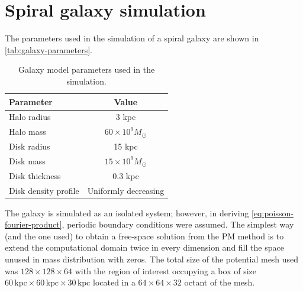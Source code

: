 \section{Spiral galaxy simulation}\label{sec:spiral-galaxy-sim}
The parameters used in the simulation of a spiral galaxy are shown in \autoref{tab:galaxy-parameters}.
\begin{table}[htp]
    \centering
    \begin{tabular}{|l|c|}
        \hline
        \textbf{Parameter}   & \textbf{Value}           \\
        \hline
        Halo radius          & 3 kpc                    \\
        Halo mass            & $60 \times 10^9 M_\odot$ \\
        Disk radius          & 15 kpc                   \\
        Disk mass            & $15 \times 10^9 M_\odot$ \\
        Disk thickness       & 0.3 kpc                  \\
        Disk density profile & Uniformly decreasing     \\
        \hline
    \end{tabular}
    \caption{Galaxy model parameters used in the simulation.}
    \label{tab:galaxy-parameters}
\end{table}
The galaxy is simulated as an isolated system; however, in deriving \autoref{eq:poisson-fourier-product}, periodic boundary conditions were assumed.
The simplest way (and the one used) to obtain a free-space solution from the PM method is to extend the computational domain twice in every dimension and fill the space unused in mass distribution with zeros.
The total size of the potential mesh used was $128 \times 128 \times 64$ with the region of interest occupying a box of size $60\, \text{kpc}\times 60\, \text{kpc}\times 30\, \text{kpc}$ located in a $64 \times 64 \times 32$ octant of the mesh.

